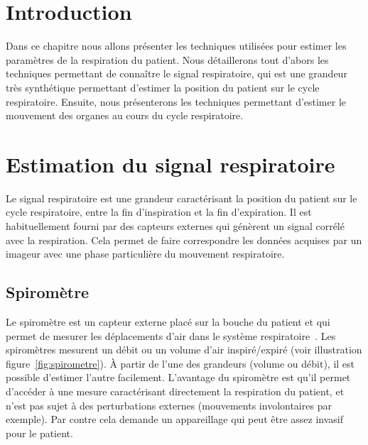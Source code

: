 \section{Introduction}

Dans ce chapitre nous allons présenter les techniques utilisées pour estimer les paramètres de la respiration du patient. Nous détaillerons tout d'abors les techniques permettant de connaître le signal respiratoire, qui est une grandeur très synthétique permettant d'estimer la position du patient sur le cycle respiratoire. Ensuite, nous présenterons les techniques permettant d'estimer le mouvement des organes au cours du cycle respiratoire.

\section{Estimation du signal respiratoire}

Le signal respiratoire est une grandeur caractérisant la position du patient sur le cycle respiratoire, entre la fin d'inspiration et la fin d'expiration. Il est habituellement fourni par des capteurs externes qui génèrent un signal corrélé avec la respiration. Cela permet de faire correspondre les données acquises par un imageur avec une phase particulière du mouvement respiratoire.

\subsection{Spiromètre}
\label{lab:spirometre}
Le spiromètre est un capteur externe placé sur la bouche du patient et qui permet de mesurer les déplacements d'air dans le système respiratoire~\cite{guivarc2004synchronization}. Les spiromètres mesurent un débit ou un volume d'air inspiré/expiré (voir illustration figure~\ref{fig:spirometre}). \`A partir de l'une des grandeurs (volume ou débit), il est possible d'estimer l'autre facilement. L'avantage du spiromètre est qu'il permet d'accéder à une mesure caractérisant directement la respiration du patient, et n'est pas sujet à des perturbations externes (mouvements involontaires par exemple). Par contre cela demande un appareillage qui peut être assez invasif pour le patient.

